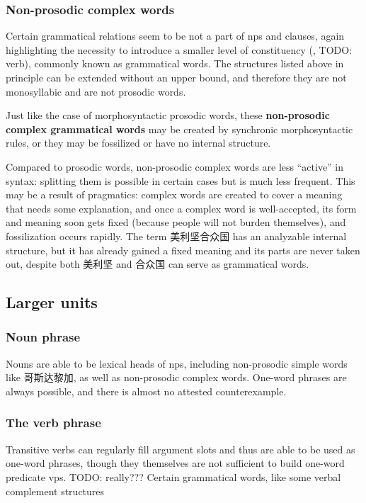 \documentclass[UTF8, a4paper, oneside, scheme=plain, 12pt]{ctexrep}
\newcommand*{\concept}[1]{\textbf{#1}}
\begin{document}
\subsubsection{Non-prosodic complex words}\label{sec:pos.word.complex}

Certain grammatical relations seem to be not a part of \ac{np}s and clauses,
again highlighting the necessity to introduce a smaller level of constituency
(, TODO: verb),
commonly known as grammatical words.
The structures listed above in principle 
can be extended without an upper bound, 
and therefore they are not monosyllabic and are not prosodic words.

Just like the case of morphosyntactic prosodic words,
these \concept{non-prosodic complex grammatical words} 
may be created by synchronic morphosyntactic rules,
or they may be fossilized or have no internal structure.

Compared to prosodic words,
non-prosodic complex words are less ``active'' in syntax:
splitting them is possible in certain cases
but is much less frequent.
This may be a result of pragmatics:
complex words are created to cover a meaning that needs some explanation,
and once a complex word is well-accepted,
its form and meaning soon gets fixed 
(because people will not burden themselves),
and fossilization occurs rapidly.
The term 美利坚合众国 has an analyzable internal structure,
but it has already gained a fixed meaning 
and its parts are never taken out,
despite both 美利坚 and 合众国 can serve as grammatical words.


\subsection{Larger units}

\subsubsection{Noun phrase}

Nouns are able to be lexical heads of \acs{np}s,
including non-prosodic simple words like 哥斯达黎加,
as well as non-prosodic complex words.
One-word phrases are always possible,
and there is almost no attested counterexample.

\subsubsection{The verb phrase}

Transitive verbs can regularly fill argument slots 
and thus are able to be used as one-word phrases,
though they themselves are not sufficient to build one-word predicate \ac{vp}s. TODO: really???
Certain grammatical words,
like some verbal complement structures 
\end{document}
